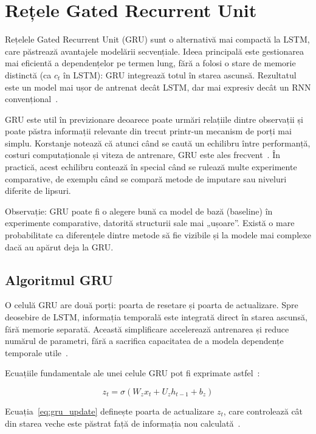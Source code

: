 \section{Rețele Gated Recurrent Unit}

Rețelele Gated Recurrent Unit (GRU) sunt o alternativă mai compactă la LSTM, care păstrează avantajele modelării secvențiale. Ideea principală este gestionarea mai eficientă a dependențelor pe termen lung, fără a folosi o stare de memorie distinctă (ca $c_t$ în LSTM): GRU integrează totul în starea ascunsă. Rezultatul este un model mai ușor de antrenat decât LSTM, dar mai expresiv decât un RNN convențional~\cite{korstanje2025gru, cho2014gru}.

GRU este util în previzionare deoarece poate urmări relațiile dintre observații și poate păstra informații relevante din trecut printr-un mecanism de porți mai simplu. Korstanje notează că atunci când se caută un echilibru între performanță, costuri computaționale și viteza de antrenare, GRU este ales frecvent~\cite{korstanje2025gru}. În practică, acest echilibru contează în special când se rulează multe experimente comparative, de exemplu când se compară metode de imputare sau niveluri diferite de lipsuri.

Observație: GRU poate fi o alegere bună ca model de bază (baseline) în experimente comparative, datorită structurii sale mai „ușoare”. Există o mare probabilitate ca diferențele dintre metode să fie vizibile și la modele mai complexe dacă au apărut deja la GRU.

\subsection{Algoritmul GRU}

O celulă GRU are două porți: poarta de resetare și poarta de actualizare. Spre deosebire de LSTM, informația temporală este integrată direct în starea ascunsă, fără memorie separată. Această simplificare accelerează antrenarea și reduce numărul de parametri, fără a sacrifica capacitatea de a modela dependențe temporale utile~\cite{korstanje2025gru, cho2014gru}.

Ecuațiile fundamentale ale unei celule GRU pot fi exprimate astfel~\cite{cho2014gru, korstanje2025gru}:

\begin{equation}
z_t = \sigma(W_z x_t + U_z h_{t-1} + b_z)
\label{eq:gru_update}
\end{equation}

Ecuația~\ref{eq:gru_update} definește poarta de actualizare $z_t$, care controlează cât din starea veche este păstrat față de informația nou calculată~\cite{cho2014gru, korstanje2025gru}.

